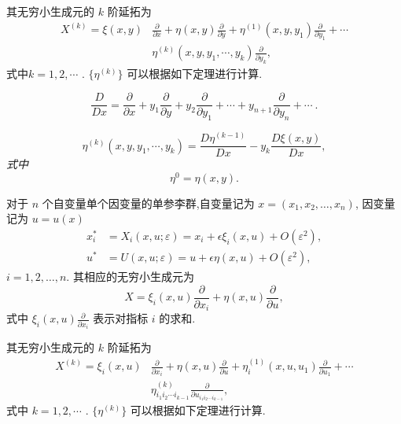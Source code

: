 其无穷小生成元的 $k$ 阶延拓为
\begin{equation*}
\begin{aligned}
X^{(k)}=\xi(x,y)&\frac{\partial}{\partial x}+\eta(x,y)\frac{\partial}{\partial y}+\eta^{(1)}(x,y,y_1)\frac{\partial}{\partial y_1}+\cdots \\
&\eta^{(k)}(x,y,y_1,\cdots,y_k)\frac{\partial}{\partial y_k},
\end{aligned}
\end{equation*}
式中$k=1,2,\cdots$ . $\{\eta^{(k)}\}$ 可以根据如下定理进行计算.

\begin{definition}[全导数算子]
\begin{equation*}
\frac{D}{Dx}=\frac{\partial}{\partial x}+y_1\frac{\partial}{\partial y}+y_2\frac{\partial}{\partial y_1}+\cdots+y_{n+1}\frac{\partial}{\partial y_{n}}+\cdots~.
\end{equation*}
\end{definition}

\begin{theorem}
\emph{\begin{equation*}
\eta^{(k)}(x,y,y_1,\cdots,y_k) = \frac{D\eta^{(k-1)}}{Dx}-y_k \frac{D\xi(x,y)}{Dx},
\end{equation*}
式中
\begin{equation*}
\eta^{0}=\eta(x,y).
\end{equation*}}
\end{theorem}

对于 $n$ 个自变量单个因变量的单参李群,自变量记为 $x=(x_1,x_2,\ldots,x_n)$, 因变量记为 $u=u(x)$
\begin{equation*}
\begin{aligned}
x_i^*&=X_i(x,u;\varepsilon)=x_i+\epsilon \xi_i(x,u)+O(\varepsilon^2),\\
u^*&=U(x,u;\varepsilon)=u+\epsilon \eta(x,u)+O(\varepsilon^2),
\end{aligned}
\end{equation*}
$i=1,2,\ldots,n$. 其相应的无穷小生成元为
\begin{equation*}
X=\xi_i(x,u)\frac{\partial}{\partial x_i}+\eta(x,u)\frac{\partial}{\partial u},
\end{equation*}
式中 $\xi_i(x,u)\frac{\partial}{\partial x_i}$ 表示对指标 $i$ 的求和.

其无穷小生成元的 $k$ 阶延拓为
\begin{equation*}
\begin{aligned}
X^{(k)}=\xi_i(x,u)&\frac{\partial}{\partial x_i}+\eta(x,u)\frac{\partial}{\partial u}+\eta_i^{(1)}(x,u,u_1)\frac{\partial}{\partial u_1}+\cdots \\
&\eta^{(k)}_{i_1i_2\cdots i_{k-1}}\frac{\partial}{\partial u_{i_1i_2\cdots i_{k-1}}},
\end{aligned}
\end{equation*}
式中 $k=1,2,\cdots$ . $\{\eta^{(k)}\}$ 可以根据如下定理进行计算.


